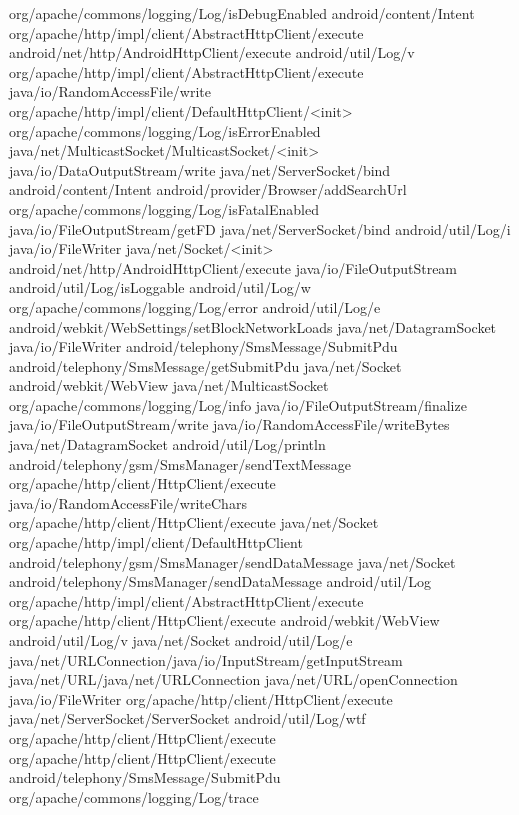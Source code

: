 org/apache/commons/logging/Log/isDebugEnabled
android/content/Intent
org/apache/http/impl/client/AbstractHttpClient/execute
android/net/http/AndroidHttpClient/execute
android/util/Log/v
org/apache/http/impl/client/AbstractHttpClient/execute
java/io/RandomAccessFile/write
org/apache/http/impl/client/DefaultHttpClient/<init>
org/apache/commons/logging/Log/isErrorEnabled
java/net/MulticastSocket/MulticastSocket/<init>
java/io/DataOutputStream/write
java/net/ServerSocket/bind
android/content/Intent
android/provider/Browser/addSearchUrl
org/apache/commons/logging/Log/isFatalEnabled
java/io/FileOutputStream/getFD
java/net/ServerSocket/bind
android/util/Log/i
java/io/FileWriter
java/net/Socket/<init>
android/net/http/AndroidHttpClient/execute
java/io/FileOutputStream
android/util/Log/isLoggable
android/util/Log/w
org/apache/commons/logging/Log/error
android/util/Log/e
android/webkit/WebSettings/setBlockNetworkLoads
java/net/DatagramSocket
java/io/FileWriter
android/telephony/SmsMessage/SubmitPdu 
android/telephony/SmsMessage/getSubmitPdu
java/net/Socket
android/webkit/WebView
java/net/MulticastSocket
org/apache/commons/logging/Log/info
java/io/FileOutputStream/finalize
java/io/FileOutputStream/write 
java/io/RandomAccessFile/writeBytes
java/net/DatagramSocket
android/util/Log/println
android/telephony/gsm/SmsManager/sendTextMessage
org/apache/http/client/HttpClient/execute
java/io/RandomAccessFile/writeChars
org/apache/http/client/HttpClient/execute
java/net/Socket
org/apache/http/impl/client/DefaultHttpClient
android/telephony/gsm/SmsManager/sendDataMessage
java/net/Socket
android/telephony/SmsManager/sendDataMessage
android/util/Log
org/apache/http/impl/client/AbstractHttpClient/execute
org/apache/http/client/HttpClient/execute
android/webkit/WebView
android/util/Log/v
java/net/Socket
android/util/Log/e
java/net/URLConnection/java/io/InputStream/getInputStream
java/net/URL/java/net/URLConnection 
java/net/URL/openConnection
java/io/FileWriter
org/apache/http/client/HttpClient/execute
java/net/ServerSocket/ServerSocket
android/util/Log/wtf
org/apache/http/client/HttpClient/execute
org/apache/http/client/HttpClient/execute
android/telephony/SmsMessage/SubmitPdu
org/apache/commons/logging/Log/trace